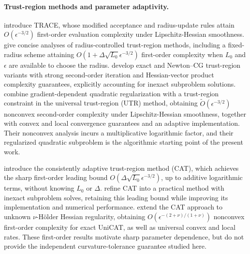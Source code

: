 \paragraph{Trust-region methods and parameter adaptivity.}
\citet{curtis2017trust} introduce TRACE, whose modified acceptance
and radius-update rules attain $O(\epsilon^{-3/2})$ first-order
evaluation complexity under Lipschitz-Hessian smoothness.
\citet{curtis2018concise} give concise analyses of radius-controlled
trust-region methods, including a fixed-radius scheme attaining
$O(1+\Delta\sqrt{L_0}\epsilon^{-3/2})$ first-order complexity when $L_0$ and
$\epsilon$ are available to choose the radius.
\citet{curtis2021trust} develop exact and Newton--CG trust-region
variants with strong second-order iteration and Hessian-vector
product complexity guarantees, explicitly accounting for inexact
subproblem solutions.
\citet{jiang2026beyond} combine gradient-dependent quadratic
regularization with a trust-region constraint in the universal
trust-region (UTR) method, obtaining
$\widetilde O(\epsilon^{-3/2})$ nonconvex second-order complexity
under Lipschitz-Hessian smoothness, together with convex and local
convergence guarantees and an adaptive implementation.
Their nonconvex analysis incurs a multiplicative logarithmic factor,
and their regularized quadratic subproblem is the algorithmic
starting point of the present work.

\citet{hamad2022consistently} introduce the consistently adaptive
trust-region method (CAT), which achieves the sharp first-order
leading bound $O(\Delta\sqrt{L_0}\epsilon^{-3/2})$, up to additive
logarithmic terms, without knowing $L_0$ or $\Delta$.
\citet{hamad2024simple} refine CAT into a practical method with
inexact subproblem solves, retaining this leading bound while
improving its implementation and numerical performance.
\citet{sirotenko2026on} extend the CAT approach to unknown
$\nu$-H\"older Hessian regularity, obtaining
$O(\epsilon^{-(2+\nu)/(1+\nu)})$ nonconvex first-order complexity
for exact UniCAT, as well as universal convex and local rates.
These first-order results motivate sharp parameter dependence, but
do not provide the independent curvature-tolerance guarantee studied
here.

